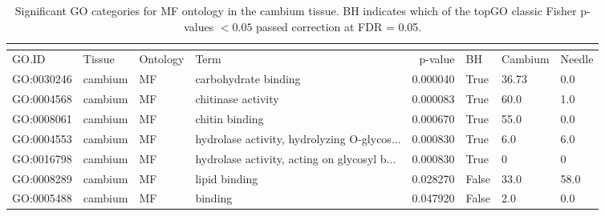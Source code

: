 \begin{longtable}{llllrl}
\caption{Significant GO categories for MF ontology in the cambium tissue. BH indicates which of the topGO classic Fisher p-values $< 0.05$ passed correction at FDR = 0.05.}\\
\label{tab:go-cambium-MF}\\
\toprule
GO.ID & Tissue & Ontology & Term & p-value & BH & Cambium & Needle \\
\midrule
GO:0030246 & cambium & MF &   carbohydrate binding  & 0.000040 &   True  & 36.73 & 0.0 \\ 
GO:0004568 & cambium & MF &   chitinase activity  & 0.000083 &   True  & 60.0 & 1.0 \\ 
GO:0008061 & cambium & MF &   chitin binding  & 0.000670 &   True  & 55.0 & 0.0 \\ 
GO:0004553 & cambium & MF &   hydrolase activity, hydrolyzing O-glycos...  & 0.000830 &   True  & 6.0 & 6.0 \\ 
GO:0016798 & cambium & MF &   hydrolase activity, acting on glycosyl b...  & 0.000830 &   True  & 0 & 0 \\
GO:0008289 & cambium & MF &   lipid binding  & 0.028270 &   False  & 33.0 & 58.0 \\ 
GO:0005488 & cambium & MF &   binding  & 0.047920 &   False  & 2.0 & 0.0 \\ 
\bottomrule
\end{longtable}
